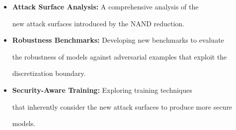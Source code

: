 \documentclass[11pt]{article}
\theoremstyle{definition}
\begin{document}
\begin{itemize}






    \item \textbf{Attack Surface Analysis:} A comprehensive analysis of the






    new attack surfaces introduced by the NAND reduction.






    






    \item \textbf{Robustness Benchmarks:} Developing new benchmarks to evaluate






    the robustness of models against adversarial examples that exploit the






    discretization boundary.






    






    \item \textbf{Security-Aware Training:} Exploring training techniques






    that inherently consider the new attack surfaces to produce more secure






    models.






\end{itemize}













\end{document}
